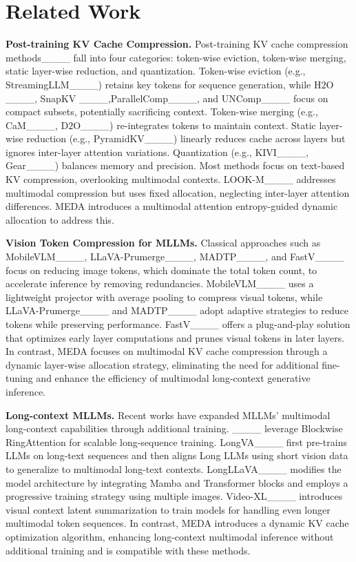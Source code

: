 \section{Related Work}
\vspace{-2mm}

\noindent \textbf{Post-training KV Cache Compression.} 
Post-training KV cache compression methods____ fall into four categories: token-wise eviction, token-wise merging, static layer-wise reduction, and quantization. Token-wise eviction (e.g., StreamingLLM____) retains key tokens for sequence generation, while $\text{H}{2}\text{O}$____, SnapKV ____,ParallelComp____, and UNComp____ focus on compact subsets, potentially sacrificing context. Token-wise merging (e.g., CaM____, $\text{D}{2} \text{O}$____) re-integrates tokens to maintain context. Static layer-wise reduction (e.g., PyramidKV____) linearly reduces cache across layers but ignores inter-layer attention variations. Quantization (e.g., KIVI____, Gear____) balances memory and precision.
%
Most methods focus on text-based KV compression, overlooking multimodal contexts. LOOK-M____ addresses multimodal compression but uses fixed allocation, neglecting inter-layer attention differences. MEDA introduces a multimodal attention entropy-guided dynamic allocation to address this.


\noindent \textbf{Vision Token Compression for MLLMs.} 
Classical approaches such as MobileVLM____, LLaVA-Prumerge____, MADTP____, and FastV____ focus on reducing image tokens, which dominate the total token count, to accelerate inference by removing redundancies. MobileVLM____ uses a lightweight projector with average pooling to compress visual tokens, while LLaVA-Prumerge____ and MADTP____ adopt adaptive strategies to reduce tokens while preserving performance. FastV____ offers a plug-and-play solution that optimizes early layer computations and prunes visual tokens in later layers.
%
In contrast, MEDA focuses on multimodal KV cache compression through a dynamic layer-wise allocation strategy, eliminating the need for additional fine-tuning and enhance the efficiency of multimodal long-context generative inference.


\noindent \textbf{Long-context MLLMs.}  
Recent works have expanded MLLMs' multimodal long-context capabilities through additional training. ____ leverage Blockwise RingAttention for scalable long-sequence training.  LongVA____ first pre-trains LLMs on long-text sequences and then aligns Long LLMs using short vision data to generalize to multimodal long-text contexts. LongLLaVA____ modifies the model architecture by integrating Mamba and Transformer blocks and employs a progressive training strategy using multiple images. Video-XL____ introduces visual context latent summarization to train models for handling even longer multimodal token sequences.
%
In contrast, MEDA introduces a dynamic KV cache optimization algorithm, enhancing long-context multimodal inference without additional training and is compatible with these methods.


